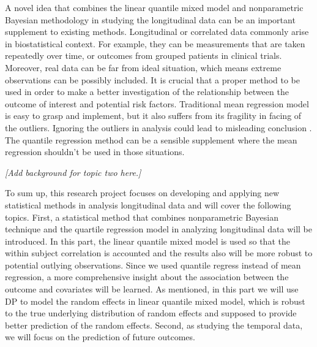 \documentclass{article}
\begin{document}
A novel idea that combines the linear quantile mixed model and nonparametric Bayesian methodology in studying the longitudinal data can be an important supplement to existing methods. Longitudinal or correlated data commonly arise in biostatistical context. For example, they can be measurements that are taken repeatedly over time, or outcomes from grouped patients in clinical trials. Moreover, real data can be far from ideal situation, which means extreme observations can be possibly included. It is crucial that a proper method to be used in order to make a better investigation of the relationship between the outcome of interest and potential risk factors. Traditional mean regression model is easy to grasp and implement, but it also suffers from its fragility in facing of the outliers. Ignoring the outliers in analysis could lead to misleading conclusion \cite{koenker2001quantile}. The quantile regression method can be a sensible supplement where the mean regression shouldn't be used in those situations. \par

\emph{[Add background for topic two here.]}\par

To sum up, this research project focuses on developing and applying new statistical methods in analysis longitudinal data and will cover the following topics. First, a statistical method that combines nonparametric Bayesian technique and the quartile regression model in analyzing longitudinal data will be introduced. In this part, the linear quantile mixed model is used so that the within subject correlation is accounted and the results also will be more robust to potential outlying observations. Since we used quantile regress instead of mean regression, a more comprehensive insight about the association between the outcome and covariates will be learned. As mentioned, in this part we will use DP to model the random effects in linear quantile mixed model, which is robust to the true underlying distribution of random effects and supposed to provide better prediction of the random effects. Second, as studying the temporal data, we will focus on the prediction of future outcomes. \par


























%
%
%
%

\end{document}
